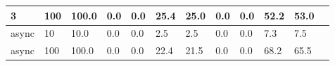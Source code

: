 \documentclass[a4paper]{report}
\begin{document}
\begin{table}[h]
\begin{tabular}{|l|l|l|l|l|l|l|l|l|l|l|l|}
		3                        & 100                                & 100.0                           & 0.0                         & 0.0                       & 25.4                           & 25.0   & 0.0 & 0.0    & 52.2 & 53.0   \\ \hline
		async                    & 10                                 & 10.0                            & 0.0                         & 0.0                       & 2.5                            & 2.5    & 0.0 & 0.0    & 7.3  & 7.5    \\ \hline
		async                    & 100                                & 100.0                           & 0.0                         & 0.0                       & 22.4                           & 21.5   & 0.0 & 0.0    & 68.2 & 65.5   \\ \hline
	\end{tabular}
\end{table}
\end{document}
